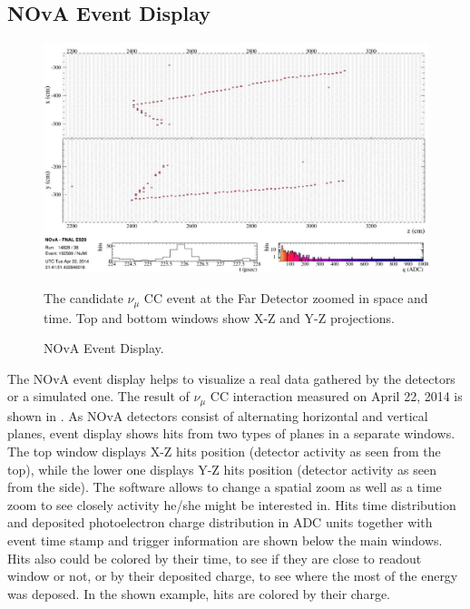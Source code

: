 \subsection{NOvA Event Display}
\begin{figure}
\includegraphics[width=1.0\textwidth]{figures/EventDisp.pdf}\\%
\caption{NOvA Event Display.}
{The candidate $\nu_\mu$ CC event at the Far Detector zoomed in space and time. Top and bottom windows show
X-Z and Y-Z projections.} \label{EVD}
\end{figure}
The NOvA event display helps to visualize a real data gathered by the detectors or a simulated one. The result
of $\nu_\mu$ CC interaction measured on April 22, 2014 is shown in . As NOvA detectors consist of 
alternating horizontal and vertical planes, event display shows hits from two types of planes in a separate 
windows. The top window displays X-Z hits position (detector activity as seen from the top), while the lower 
one displays Y-Z hits position (detector activity as seen from the side). The software allows to change a spatial zoom as well as a time zoom to see closely activity he/she might be interested in. Hits time distribution and 
deposited photoelectron charge distribution in ADC units together with event time stamp and trigger information 
are shown below the main windows. Hits also could be colored by their time, to see if they are close to readout 
window or not, or by their deposited charge, to see where the most of the energy was deposed. In the shown 
example, hits are colored by their charge.
